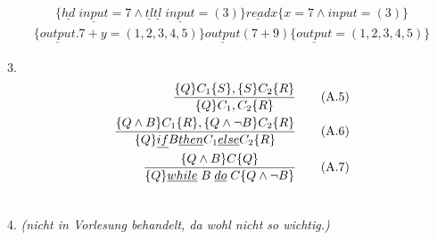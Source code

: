 \begin{compactitem}
		\begin{align*}
		\{\underline{hd}\;\underline{input}=7 \land \underline{tl} \underline{tl}\;\underline{input}=(3) \} \underline{read} x \{x=7 \land input=(3)\}
		\end{align*}
		\begin{align*}
		\{\underline{output}.7+y=(1,2,3,4,5)\} \underline{output} (7+9) \{\underline{output} = (1,2,3,4,5)\}
		\end{align*}
	\item[3.]
	\begin{align}
	\frac{\{Q\}C_1\{S\},\{S\}C_2\{R\}}{\{Q\}C_1,C_2\{R\}}\tag{A.5}\\
	\frac{\{Q\land B\}C_1\{R\},\{Q\land \lnot B\}C_2\{R\}}{\{Q\}\underline{if}B\underline{then}C_1\underline{else}C_2\{R\}}\tag{A.6}\\
	\frac{\{Q\land B\}C\{Q\}}{\{Q\}\underline{while}\;B\;\underline{do}\;C\{Q\land \lnot B\}}\tag{A.7}\\
	\notag
	\end{align}
	\item[4.] \emph{(nicht in Vorlesung behandelt, da wohl nicht so wichtig.)}
\end{compactitem}
